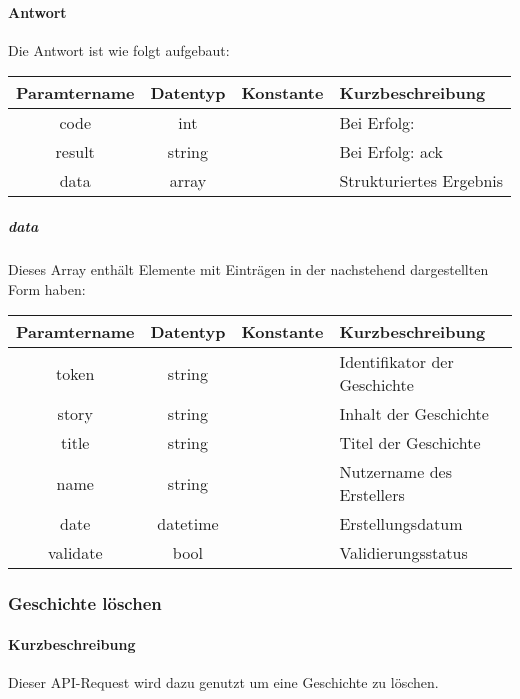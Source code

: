 \paragraph{Antwort}Die Antwort ist wie folgt aufgebaut:
\begin{table}[H]
	\begin{tabular}{|c|c|c|p{6.5cm}|}
		\hline
		\textbf{Paramtername} & \textbf{Datentyp} & \textbf{Konstante} & \textbf{Kurzbeschreibung}            \\ \hline                
		code                & int              &                 & Bei Erfolg: {\glqq 0\grqq} \\ \hline
		result              & string           &                 & Bei Erfolg: {\glqq ack\grqq} \\ \hline
		data                & array            &                 & Strukturiertes Ergebnis \\ \hline
	\end{tabular}
\end{table}
\subparagraph{data}Dieses Array enthält Elemente mit Einträgen in der nachstehend dargestellten Form haben:
\begin{table}[H]
	\begin{tabular}{|c|c|c|p{6.5cm}|}
		\hline
		\textbf{Paramtername} & \textbf{Datentyp} & \textbf{Konstante} & \textbf{Kurzbeschreibung}    \\ \hline
		token              & string            &                 & Identifikator der Geschichte \\ \hline
		story              & string            &                 & Inhalt der Geschichte \\ \hline
		title              & string            &                 & Titel der Geschichte \\ \hline
		name               & string            &                 & Nutzername des Erstellers \\ \hline
		date               & datetime          &                 & Erstellungsdatum \\ \hline
		validate           & bool              &                 & Validierungsstatus \\ \hline
	\end{tabular}
\end{table}
\subsubsection{Geschichte löschen}
\paragraph{Kurzbeschreibung}Dieser API-Request wird dazu genutzt um eine Geschichte zu löschen.
